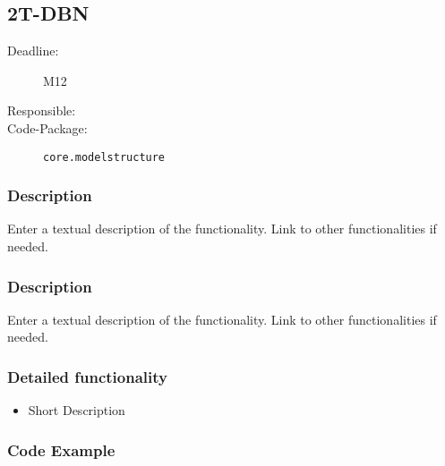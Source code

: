 \newpage
\subsection{2T-DBN}
\label{Functionality:ID}

\begin{description}
\item[Deadline:] M12
\item[Responsible:]
\item[Code-Package:] \texttt{core.modelstructure}
\end{description}

\subsubsection*{Description}

Enter a textual description of the functionality. Link to other functionalities if needed. 


\subsubsection*{Description}

Enter a textual description of the functionality. Link to other functionalities if needed. 

\subsubsection*{Detailed functionality}

\begin{itemize}
\item Short Description
\end{itemize}

\subsubsection*{Code Example}

